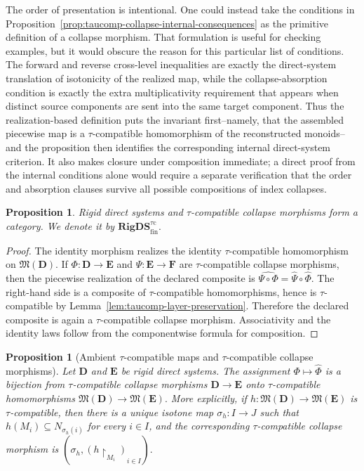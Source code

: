 \documentclass[pdflatex,sn-mathphys-num]{sn-jnl}
\theoremstyle{thmstyleone}%
\newtheorem{proposition}[theorem]{Proposition}
\theoremstyle{thmstyletwo}%
\theoremstyle{thmstylethree}%
\begin{document}
The order of presentation is intentional.
One could instead take the conditions in Proposition~\ref{prop:taucomp-collapse-internal-consequences} as the primitive definition of a collapse morphism.
That formulation is useful for checking examples, but it would obscure the reason for this particular list of conditions.
The forward and reverse cross-level inequalities are exactly the direct-system translation of isotonicity of the realized map, while the collapse-absorption condition is exactly the extra multiplicativity requirement that appears when distinct source components are sent into the same target component.
Thus the realization-based definition puts the invariant first--namely, that the assembled piecewise map is a \(\tau\)-compatible homomorphism of the reconstructed monoids--and the proposition then identifies the corresponding internal direct-system criterion.
It also makes closure under composition immediate; a direct proof from the internal conditions alone would require a separate verification that the order and absorption clauses survive all possible compositions of index collapses.

\begin{proposition}\label{prop:rigds-taucomp-category}
Rigid direct systems and \(\tau\)-compatible collapse morphisms form a category.
We denote it by \(\mathbf{RigDS}^{\tau\mathrm{c}}_{\mathrm{fin}}. \)
\end{proposition}

\begin{proof}
The identity morphism realizes the identity \(\tau\)-compatible homomorphism on \(\mathfrak M(\mathbf D)\).
If \(\Phi\colon\mathbf D\to\mathbf E\) and \(\Psi\colon\mathbf E\to\mathbf F\) are \(\tau\)-compatible collapse morphisms, then the piecewise realization of the declared composite is \(\widehat{\Psi\circ\Phi}=\widehat\Psi\circ\widehat\Phi.\)
The right-hand side is a composite of \(\tau\)-compatible homomorphisms, hence is \(\tau\)-compatible by Lemma~\ref{lem:taucomp-layer-preservation}.
Therefore the declared composite is again a \(\tau\)-compatible collapse morphism.
Associativity and the identity laws follow from the componentwise formula for composition.
\end{proof}

\begin{proposition}[Ambient \(\tau\)-compatible maps and \(\tau\)-compatible collapse morphisms]
\label{prop:ambient-taucomp-maps-vs-taucomp-collapse}
Let \(\mathbf D\) and \(\mathbf E\) be rigid direct systems.
The assignment \(\Phi\longmapsto\widehat\Phi \) is a bijection from \(\tau\)-compatible collapse morphisms \(\mathbf D\to\mathbf E\) onto \(\tau\)-compatible homomorphisms \(\mathfrak M(\mathbf D)\to\mathfrak M(\mathbf E). \)
More explicitly, if \(h\colon\mathfrak M(\mathbf D)\to\mathfrak M(\mathbf E) \) is \(\tau\)-compatible, then there is a unique isotone map \(\sigma_h\colon I\to J\) such that \(h(M_i)\subseteq N_{\sigma_h(i)}\) for every \(i\in I\), and the corresponding \(\tau\)-compatible collapse morphism is \((\sigma_h,(h\!\upharpoonright_{M_i})_{i\in I}). \)
\end{proposition}
\end{document}
